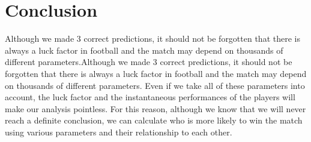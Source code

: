 \documentclass[conference]{IEEEtran}
\begin{document}
\section{Conclusion}
Although we made 3 correct predictions, it should not be forgotten that there is always a luck factor in football and the match may depend on thousands of different parameters.Although we made 3 correct predictions, it should not be forgotten that there is always a luck factor in football and the match may depend on thousands of different parameters. Even if we take all of these parameters into account, the luck factor and the instantaneous performances of the players will make our analysis pointless. For this reason, although we know that we will never reach a definite conclusion, we can calculate who is more likely to win the match using various parameters and their relationship to each other.
\end{document}
